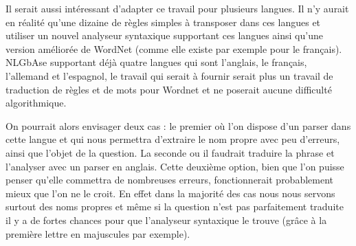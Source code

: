 \documentclass[10pt,a4paper]{article}
\begin{document}
\par Il serait aussi intéressant d'adapter ce travail pour plusieurs langues. Il n'y aurait en réalité qu'une dizaine de règles simples à transposer dans ces langues et utiliser un nouvel analyseur syntaxique supportant ces langues ainsi qu'une version améliorée de WordNet (comme elle existe par exemple pour le français). NLGbAse supportant déjà quatre langues qui sont l'anglais, le français, l'allemand et l'espagnol, le travail qui serait à fournir serait plus un travail de traduction de règles et de mots pour Wordnet et ne poserait aucune difficulté algorithmique. 
\par On pourrait alors envisager deux cas : le premier où l'on dispose d'un parser dans cette langue et qui nous permettra d'extraire le nom propre avec peu d'erreurs, ainsi que l'objet de la question. La seconde ou il faudrait traduire la phrase et l'analyser avec un parser en anglais. Cette deuxième option, bien que l'on puisse penser qu'elle commettra de nombreuses erreurs, fonctionnerait probablement mieux que l'on ne le croit. En effet dans la majorité des cas nous nous servons surtout des noms propres et même si la question n'est pas parfaitement traduite il y a de fortes chances pour que l'analyseur syntaxique le trouve (grâce à la première lettre en majuscules par exemple). 
\end{document}
